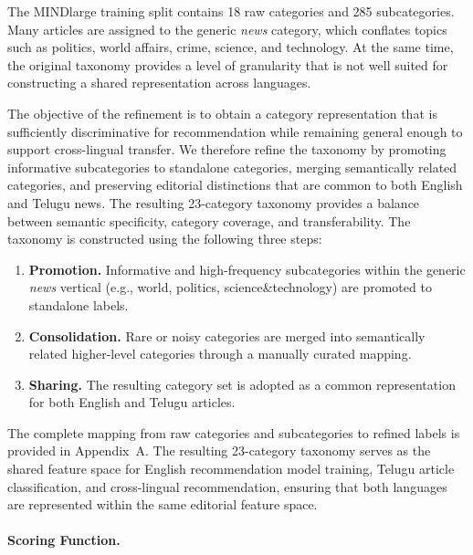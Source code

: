 \documentclass[conference]{IEEEtran}
\begin{document}
The MINDlarge training split contains 18 raw categories and 285 subcategories. Many articles are assigned to the generic \textit{news} category, which conflates topics such as politics, world affairs, crime, science, and technology. At the same time, the original taxonomy provides a level of granularity that is not well suited for constructing a shared representation across languages.

The objective of the refinement is to obtain a category representation that is sufficiently discriminative for recommendation while remaining general enough to support cross-lingual transfer. We therefore refine the taxonomy by promoting informative subcategories to standalone categories, merging semantically related categories, and preserving editorial distinctions that are common to both English and Telugu news. The resulting 23-category taxonomy provides a balance between semantic specificity, category coverage, and transferability. The taxonomy is constructed using the following three steps:

\begin{enumerate}

\item \textbf{Promotion.} Informative and high-frequency subcategories within the generic \textit{news} vertical (e.g., world, politics, science\&technology) are promoted to standalone labels.

\item \textbf{Consolidation.} Rare or noisy categories are merged into semantically related higher-level categories through a manually curated mapping.

\item \textbf{Sharing.} The resulting category set is adopted as a common representation for both English and Telugu articles.

\end{enumerate}

The complete mapping from raw categories and subcategories to refined labels is provided in Appendix~A. The resulting 23-category taxonomy serves as the shared feature space for English recommendation model training, Telugu article classification, and cross-lingual recommendation, ensuring that both languages are represented within the same editorial feature space.

\paragraph{Scoring Function.}
\end{document}
